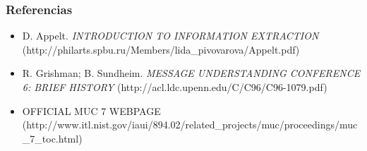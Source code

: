 \documentclass[xcolor=dvipsnames]{beamer}
\begin{document}

%

\begin{frame}
\frametitle{Referencias}
\tiny{
\begin{itemize}
 \item D. Appelt. \emph{INTRODUCTION TO INFORMATION EXTRACTION} (http://philarts.spbu.ru/Members/lida\_pivovarova/Appelt.pdf)
 \item R. Grishman; B. Sundheim. \emph{MESSAGE UNDERSTANDING CONFERENCE 6: BRIEF HISTORY} (http://acl.ldc.upenn.edu/C/C96/C96-1079.pdf)
 \item OFFICIAL MUC 7 WEBPAGE (http://www.itl.nist.gov/iaui/894.02/related\_projects/muc/proceedings/muc\_7\_toc.html)
\end{itemize}
}
\end{frame}
\end{document}
